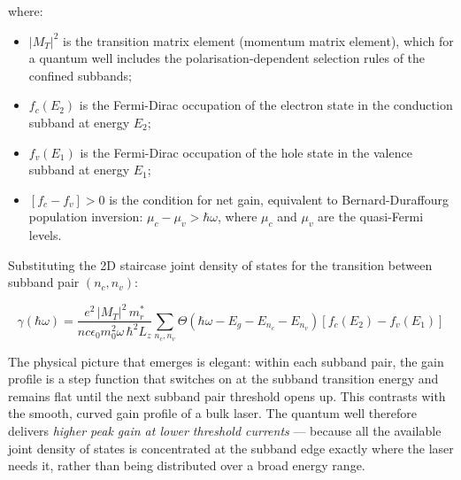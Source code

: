where:
\begin{itemize}
  \item $|M_T|^2$ is the transition matrix element (momentum matrix element), which for a quantum well includes the polarisation-dependent selection rules of the confined subbands;
  \item $f_c(E_2)$ is the Fermi-Dirac occupation of the electron state in the conduction subband at energy $E_2$;
  \item $f_v(E_1)$ is the Fermi-Dirac occupation of the hole state in the valence subband at energy $E_1$;
  \item $[f_c - f_v] > 0$ is the condition for net gain, equivalent to Bernard-Duraffourg population inversion: $\mu_c - \mu_v > \hbar\omega$, where $\mu_c$ and $\mu_v$ are the quasi-Fermi levels.
\end{itemize}

Substituting the 2D staircase joint density of states for the transition between subband pair $(n_c, n_v)$:

\begin{equation*}
  \boxed{\gamma(\hbar\omega) = \frac{e^2\,|M_T|^2\,m_r^*}{n c \epsilon_0 m_0^2 \omega\,\hbar^2 L_z}\sum_{n_c,n_v}\Theta(\hbar\omega - E_g - E_{n_c} - E_{n_v})\left[f_c(E_2) - f_v(E_1)\right]}
\end{equation*}

The physical picture that emerges is elegant: within each subband pair, the gain profile is a step function that switches on at the subband transition energy and remains flat until the next subband pair threshold opens up. This contrasts with the smooth, curved gain profile of a bulk laser. The quantum well therefore delivers \emph{higher peak gain at lower threshold currents} — because all the available joint density of states is concentrated at the subband edge exactly where the laser needs it, rather than being distributed over a broad energy range.
